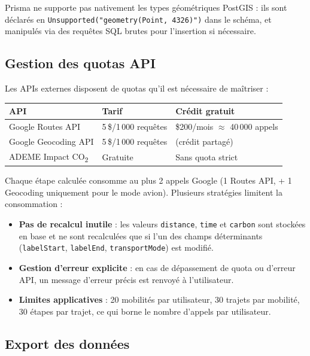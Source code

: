 \documentclass[11pt,a4paper]{article}
\begin{document}
Prisma ne supporte pas nativement les types géométriques PostGIS : ils sont déclarés en \texttt{Unsupported("geometry(Point, 4326)")} dans le schéma, et manipulés via des requêtes SQL brutes pour l'insertion si nécessaire.

\subsection{Gestion des quotas API}

Les APIs externes disposent de quotas qu'il est nécessaire de maîtriser :

\begin{center}
\begin{tabular}{p{3.8cm}p{5cm}p{4.5cm}}
\toprule
\textbf{API} & \textbf{Tarif} & \textbf{Crédit gratuit} \\
\midrule
Google Routes API    & 5\,\$/1\,000 requêtes & \$200/mois $\approx$ 40\,000 appels \\
Google Geocoding API & 5\,\$/1\,000 requêtes & (crédit partagé) \\
ADEME Impact CO\textsubscript{2}  & Gratuite              & Sans quota strict \\
\bottomrule
\end{tabular}
\end{center}

Chaque étape calculée consomme au plus 2 appels Google (1 Routes API, + 1 Geocoding uniquement pour le mode avion). Plusieurs stratégies limitent la consommation :

\begin{itemize}
  \item \textbf{Pas de recalcul inutile} : les valeurs \texttt{distance}, \texttt{time} et \texttt{carbon} sont stockées en base et ne sont recalculées que si l'un des champs déterminants (\texttt{labelStart}, \texttt{labelEnd}, \texttt{transportMode}) est modifié.
  \item \textbf{Gestion d'erreur explicite} : en cas de dépassement de quota ou d'erreur API, un message d'erreur précis est renvoyé à l'utilisateur.
  \item \textbf{Limites applicatives} : 20 mobilités par utilisateur, 30 trajets par mobilité, 30 étapes par trajet, ce qui borne le nombre d'appels par utilisateur.
\end{itemize}

\subsection{Export des données}
\end{document}

